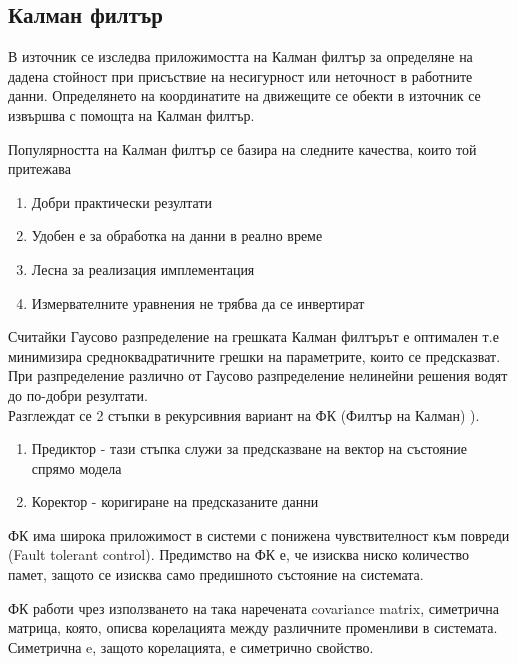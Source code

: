 \subsection{Калман филтър} \label{kalmanSect}

В източник \cite{kalmanTutorial} се изследва приложимостта на Калман филтър за определяне на дадена стойност при присъствие на несигурност или неточност в работните данни. Определянето на координатите на движещите се обекти в източник \cite{bristolBeacons} се извършва с помощта на Калман филтър. 

Популярността на Калман филтър се базира на следните качества, които той притежава

\begin{enumerate}
    \item Добри практически резултати
    \item Удобен е за обработка на данни в реално време
    \item Лесна за реализация имплементация
    \item Измервателните уравнения не трябва да се инвертират
\end{enumerate}

Считайки Гаусово разпределение на грешката Калман филтърът е оптимален т.е минимизира средноквадратичните грешки на параметрите, които се предсказват. При разпределение различно от Гаусово разпределение нелинейни решения водят до по-добри резултати. \\

Разглеждат се 2 стъпки в рекурсивния вариант на ФК (Филтър на Калман) \cite{kalmanTU}).

\begin{enumerate}
    \item Предиктор - тази стъпка служи за предсказване на вектор на състояние спрямо модела
    \item Коректор - коригиране на предсказаните данни
\end{enumerate}

ФК има широка приложимост в системи с понижена чувствителност към повреди (Fault tolerant control). Предимство на ФК е, че изисква ниско количество памет, защото се изисква само предишното състояние на системата.

ФК работи чрез използването на така наречената covariance matrix, симетрична матрица, която, описва корелацията между различните променливи в системата. Симетрична e, защото корелацията, е симетрично свойство.